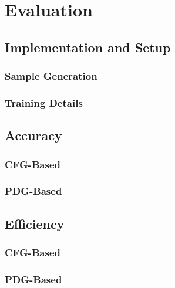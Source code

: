 \chapter{Evaluation}
\section{Implementation and Setup}
\subsection{Sample Generation}
\subsection{Training Details}
\section{Accuracy}
\subsection{CFG-Based}
\subsection{PDG-Based}
\section{Efficiency}
\subsection{CFG-Based}
\subsection{PDG-Based}
